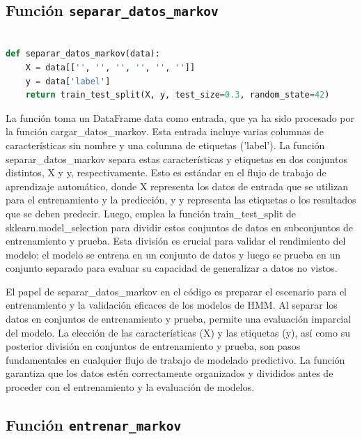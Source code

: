 \documentclass[12pt]{article}
\begin{document}
\subsection*{Función \texttt{separar\_datos\_markov}}
\vspace{1cm}

\begin{lstlisting}[language=Python]

def separar_datos_markov(data):
	X = data[['', '', '', '', '', '']]
	y = data['label']
	return train_test_split(X, y, test_size=0.3, random_state=42)

\end{lstlisting}
\vspace{1cm}

La función toma un DataFrame data como entrada, que ya ha sido procesado por la función cargar\_datos\_markov. Esta entrada incluye varias columnas de características sin nombre y una columna de etiquetas ('label'). La función separar\_datos\_markov separa estas características y etiquetas en dos conjuntos distintos, X y y, respectivamente. Esto es estándar en el flujo de trabajo de aprendizaje automático, donde X representa los datos de entrada que se utilizan para el entrenamiento y la predicción, y y representa las etiquetas o los resultados que se deben predecir. Luego, emplea la función train\_test\_split de sklearn.model\_selection para dividir estos conjuntos de datos en subconjuntos de entrenamiento y prueba. Esta división es crucial para validar el rendimiento del modelo: el modelo se entrena en un conjunto de datos y luego se prueba en un conjunto separado para evaluar su capacidad de generalizar a datos no vistos.\vspace{1cm}

El papel de separar\_datos\_markov en el código es preparar el escenario para el entrenamiento y la validación eficaces de los modelos de HMM. Al separar los datos en conjuntos de entrenamiento y prueba, permite una evaluación imparcial del modelo. La elección de las características (X) y las etiquetas (y), así como su posterior división en conjuntos de entrenamiento y prueba, son pasos fundamentales en cualquier flujo de trabajo de modelado predictivo. La función garantiza que los datos estén correctamente organizados y divididos antes de proceder con el entrenamiento y la evaluación de modelos.

\vspace{1cm}

\subsection*{Función \texttt{entrenar\_markov}}
\vspace{1cm}
\end{document}
